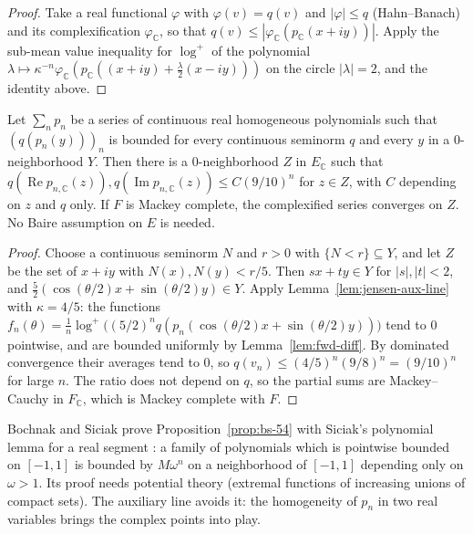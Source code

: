 \begin{proof}
  \leanok
  Take a real functional $\varphi$ with $\varphi(v) = q(v)$ and $|\varphi| \le q$ (Hahn--Banach)
  and its complexification $\varphi_{\mathbb{C}}$, so that $q(v) \le |\varphi_{\mathbb{C}}(p_{\mathbb{C}}(x
  + iy))|$. Apply the sub-mean value inequality for $\log^+$ of the polynomial
  $\lambda \mapsto \kappa^{-n} \varphi_{\mathbb{C}}(p_{\mathbb{C}}((x + iy) + \tfrac{\lambda}{2}(x - iy)))$
  on the circle $|\lambda| = 2$, and the identity above.
\end{proof}

\begin{proposition}
  \label{prop:bs-54}
  \leanok
  Let $\sum_n p_n$ be a series of continuous real homogeneous polynomials such that
  $(q(p_n(y)))_n$ is bounded for every continuous seminorm $q$ and every $y$ in a
  $0$-neighborhood $Y$. Then there is a $0$-neighborhood $Z$ in $E_{\mathbb{C}}$ such that
  $q(\operatorname{Re} p_{n,\mathbb{C}}(z)), q(\operatorname{Im} p_{n,\mathbb{C}}(z)) \le C (9/10)^n$
  for $z \in Z$, with $C$ depending on $z$ and $q$ only. If $F$ is Mackey complete, the
  complexified series converges on $Z$. No Baire assumption on $E$ is needed.
\end{proposition}

\begin{proof}
  \leanok
  Choose a continuous seminorm $N$ and $r > 0$ with $\{N < r\} \subseteq Y$, and let $Z$ be the
  set of $x + iy$ with $N(x), N(y) < r/5$. Then $sx + ty \in Y$ for $|s|, |t| < 2$, and
  $\tfrac52(\cos(\theta/2) x + \sin(\theta/2) y) \in Y$. Apply Lemma~\ref{lem:jensen-aux-line}
  with $\kappa = 4/5$: the functions
  $f_n(\theta) = \frac1n \log^+ \big((5/2)^n q(p_n(\cos(\theta/2) x + \sin(\theta/2) y))\big)$ tend
  to $0$ pointwise, and are bounded uniformly by Lemma~\ref{lem:fwd-diff}. By dominated
  convergence their averages tend to $0$, so $q(v_n) \le (4/5)^n (9/8)^n = (9/10)^n$ for large
  $n$. The ratio does not depend on $q$, so the partial sums are Mackey--Cauchy in
  $F_{\mathbb{C}}$, which is Mackey complete with $F$.
\end{proof}

Bochnak and Siciak prove Proposition~\ref{prop:bs-54} with Siciak's polynomial lemma for a real
segment \cite[\S4]{BS71b}: a family of polynomials which is pointwise bounded on $[-1, 1]$ is
bounded by $M \omega^n$ on a neighborhood of $[-1, 1]$ depending only on $\omega > 1$. Its
proof needs potential theory (extremal functions of increasing unions of compact sets). The
auxiliary line avoids it: the homogeneity of $p_n$ in two real variables brings the complex
points into play.

